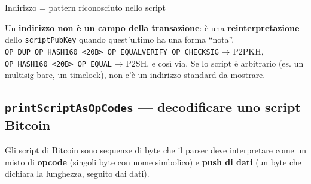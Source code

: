 \documentclass[
  italian,
  openany]{book}
\begin{document}
\begin{callouttip}{Indirizzo = pattern riconosciuto nello script}

Un \textbf{indirizzo non è un campo della transazione}: è una
\textbf{reinterpretazione} dello \texttt{scriptPubKey} quando
quest'ultimo ha una forma ``nota''.
\texttt{OP\_DUP\ OP\_HASH160\ \textless{}20B\textgreater{}\ OP\_EQUALVERIFY\ OP\_CHECKSIG}
→ P2PKH, \texttt{OP\_HASH160\ \textless{}20B\textgreater{}\ OP\_EQUAL} →
P2SH, e così via. Se lo script è arbitrario (es. un multisig bare, un
timelock), non c'è un indirizzo standard da mostrare.

\end{callouttip}

\subsection{\texorpdfstring{\texttt{printScriptAsOpCodes} ---
decodificare uno script
Bitcoin}{printScriptAsOpCodes --- decodificare uno script Bitcoin}}\label{printscriptasopcodes-decodificare-uno-script-bitcoin}

Gli script di Bitcoin sono sequenze di byte che il parser deve
interpretare come un misto di \textbf{opcode} (singoli byte con nome
simbolico) e \textbf{push di dati} (un byte che dichiara la lunghezza,
seguito dai dati).
\end{document}

